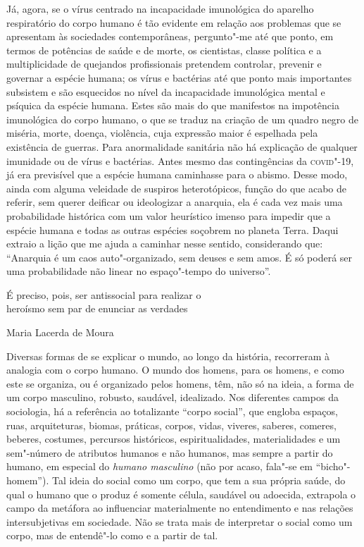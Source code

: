 Já, agora, se o vírus centrado na incapacidade imunológica do aparelho
respiratório do corpo humano é tão evidente em relação aos problemas que
se apresentam às sociedades contemporâneas, pergunto"-me até que ponto,
em termos de potências de saúde e de morte, os cientistas, classe
política e a multiplicidade de quejandos profissionais pretendem
controlar, prevenir e governar a espécie humana; os vírus e bactérias
até que ponto mais importantes subsistem e são esquecidos no nível da
incapacidade imunológica mental e psíquica da espécie humana. Estes são
mais do que manifestos na impotência imunológica do corpo humano, o que
se traduz na criação de um quadro negro de miséria, morte, doença,
violência, cuja expressão maior é espelhada pela existência de guerras.
Para anormalidade sanitária não há explicação de qualquer imunidade ou
de vírus e bactérias. Antes mesmo das contingências da \textsc{covid}"-19, já era
previsível que a espécie humana caminhasse para o abismo. Desse modo,
ainda com alguma veleidade de suspiros heterotópicos, função do que
acabo de referir, sem querer deificar ou ideologizar a anarquia, ela é
cada vez mais uma probabilidade histórica com um valor heurístico imenso
para impedir que a espécie humana e todas as outras espécies soçobrem no
planeta Terra. Daqui extraio a lição que me ajuda a caminhar nesse
sentido, considerando que: ``Anarquia é um caos auto"-organizado, sem
deuses e sem amos. É só poderá ser uma probabilidade não linear no
espaço"-tempo do universo''.




\epigraph{É preciso, pois, ser antissocial para realizar o\\
heroísmo sem par de enunciar as verdades}{Maria Lacerda de Moura}

Diversas formas de se explicar o mundo,
ao longo da história, recorreram à analogia com o corpo humano. O mundo
dos homens, para os homens, e como este se organiza, ou é organizado
pelos homens, têm, não só na ideia, a forma de um corpo masculino,
robusto, saudável, idealizado. Nos diferentes campos da sociologia, há a
referência ao totalizante ``corpo social'', que engloba espaços, ruas,
arquiteturas, biomas, práticas, corpos, vidas, viveres, saberes,
comeres, beberes, costumes, percursos históricos, espiritualidades,
materialidades e um sem"-número de atributos humanos e não humanos, mas
sempre a partir do humano, em especial do \emph{humano masculino} (não
por acaso, fala"-se em ``bicho"-homem''). Tal ideia do social como um
corpo, que tem a sua própria saúde, do qual o humano que o produz é
somente célula, saudável ou adoecida, extrapola o campo da metáfora ao
influenciar materialmente no entendimento e nas relações intersubjetivas
em sociedade. Não se trata mais de interpretar o social como um corpo,
mas de entendê"-lo como e a partir de tal.

